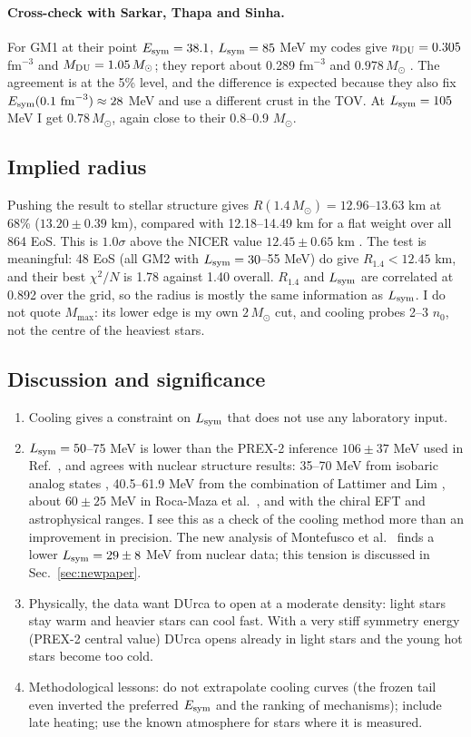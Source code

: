 \documentclass[11pt,a4paper]{article}
\newcommand{\Esym}{E_{\rm sym}}
\newcommand{\Lsym}{L_{\rm sym}}
\newcommand{\Msun}{M_\odot}
\begin{document}
\paragraph{Cross-check with Sarkar, Thapa and Sinha.} For GM1 at their point $\Esym=38.1$, $\Lsym=85$ MeV my codes give $n_{\rm DU}=0.305$ fm$^{-3}$ and $M_{\rm DU}=1.05\,\Msun$; they report about 0.289 fm$^{-3}$ and $0.978\,\Msun$ \cite{Sarkar2023}. The agreement is at the 5\% level, and the difference is expected because they also fix $\Esym(0.1~{\rm fm}^{-3})\approx28$ MeV and use a different crust in the TOV. At $\Lsym=105$ MeV I get $0.78\,\Msun$, again close to their 0.8--0.9 $\Msun$.

\subsection{Implied radius}
Pushing the result to stellar structure gives $R(1.4\,\Msun)=12.96$--$13.63$ km at 68\% ($13.20\pm0.39$ km), compared with 12.18--14.49 km for a flat weight over all 864 EoS. This is $1.0\sigma$ above the NICER value $12.45\pm0.65$ km \cite{Miller2021,Riley2021}. The test is meaningful: 48 EoS (all GM2 with $\Lsym=30$--55 MeV) do give $R_{1.4}<12.45$ km, and their best $\chi^2/N$ is 1.78 against 1.40 overall. $R_{1.4}$ and $\Lsym$ are correlated at 0.892 over the grid, so the radius is mostly the same information as $\Lsym$. I do not quote $M_{\max}$: its lower edge is my own $2\,\Msun$ cut, and cooling probes 2--3 $n_0$, not the centre of the heaviest stars.

\subsection{Discussion and significance}
\begin{enumerate}
\item Cooling gives a constraint on $\Lsym$ that does not use any laboratory input.
\item $\Lsym=50$--75 MeV is lower than the PREX-2 inference $106\pm37$ MeV \cite{Reed2021} used in Ref.~\cite{Sarkar2023}, and agrees with nuclear structure results: 35--70 MeV from isobaric analog states \cite{DanielewiczLee2014}, 40.5--61.9 MeV from the combination of Lattimer and Lim \cite{LattimerLim2013}, about $60\pm25$ MeV in Roca-Maza et al.\ \cite{RocaMaza2011}, and with the chiral EFT \cite{Drischler2020} and astrophysical \cite{Essick2021} ranges. I see this as a check of the cooling method more than an improvement in precision. The new analysis of Montefusco et al.\ \cite{Montefusco2026} finds a lower $\Lsym=29\pm8$ MeV from nuclear data; this tension is discussed in Sec.~\ref{sec:newpaper}.
\item Physically, the data want DUrca to open at a moderate density: light stars stay warm and heavier stars can cool fast. With a very stiff symmetry energy (PREX-2 central value) DUrca opens already in light stars and the young hot stars become too cold.
\item Methodological lessons: do not extrapolate cooling curves (the frozen tail even inverted the preferred $\Esym$ and the ranking of mechanisms); include late heating; use the known atmosphere for stars where it is measured.
\end{enumerate}
\end{document}
